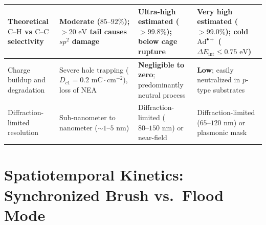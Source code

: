 \documentclass[10pt,twocolumn,a4paper]{article}
\begin{document}
\begin{table}[t]
{\begin{tabular}{@{}p{3.6cm}p{4.3cm}p{4.3cm}p{4.3cm}@{}}
Theoretical $\text{C--H}$ vs $\text{C--C}$ selectivity & Moderate ($85\text{--}92\%$); $>20\text{ eV}$ tail causes $sp^2$ damage & \textbf{Ultra-high estimated ($>99.8\%$)}; below cage rupture & \textbf{Very high estimated ($>99.0\%$)}; cold $\text{Ad}^{\bullet+}$ ($\Delta E_{\text{int}} \le 0.75\text{ eV}$) \\ \midrule
Charge buildup and degradation & Severe hole trapping ($D_{c1}=0.2\text{ mC}\cdot\text{cm}^{-2}$), loss of NEA & \textbf{Negligible to zero}; predominantly neutral process & \textbf{Low}; easily neutralized in $p$-type substrates \\ \midrule
Diffraction-limited resolution & Sub-nanometer to nanometer ($\sim 1\text{--}5\text{ nm}$) & Diffraction-limited ($80\text{--}150\text{ nm}$) or near-field & Diffraction-limited ($65\text{--}120\text{ nm}$) or plasmonic mask \\ \bottomrule
\end{tabular}%
}
\end{table}

\section{Spatiotemporal Kinetics: Synchronized Brush vs.\ Flood Mode}
\end{document}
